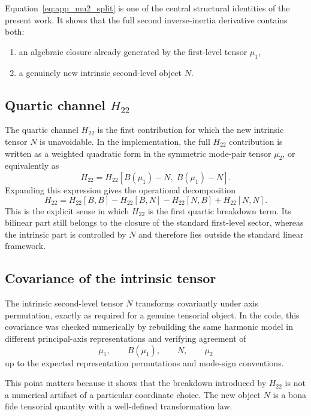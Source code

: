 Equation~\eqref{eq:app_mu2_split} is one of the central structural identities of
the present work. It shows that the full second inverse-inertia derivative
contains both:
\begin{enumerate}
\item an algebraic closure already generated by the first-level tensor $\mu_1$,
\item a genuinely new intrinsic second-level object $N$.
\end{enumerate}

\subsection{Quartic channel \texorpdfstring{$H_{22}$}{H22}}

The quartic channel $H_{22}$ is the first contribution for which the new
intrinsic tensor $N$ is unavoidable. In the implementation, the full $H_{22}$
contribution is written as a weighted quadratic form in the symmetric mode-pair
tensor $\mu_2$, or equivalently as
\begin{equation}
H_{22} = H_{22}[B(\mu_1)-N,\;B(\mu_1)-N].
\end{equation}
Expanding this expression gives the operational decomposition
\begin{equation}
H_{22}
=
H_{22}[B,B]
-H_{22}[B,N]
-H_{22}[N,B]
+H_{22}[N,N].
\end{equation}
This is the explicit sense in which $H_{22}$ is the first quartic breakdown
term. Its bilinear part still belongs to the closure of the standard
first-level sector, whereas the intrinsic part is controlled by $N$ and
therefore lies outside the standard linear framework.

\subsection{Covariance of the intrinsic tensor}

The intrinsic second-level tensor $N$ transforms covariantly under axis
permutation, exactly as required for a genuine tensorial object. In the code,
this covariance was checked numerically by rebuilding the same harmonic model in
different principal-axis representations and verifying agreement of
\begin{equation}
\mu_1,\qquad B(\mu_1),\qquad N,\qquad \mu_2
\end{equation}
up to the expected representation permutations and mode-sign conventions.

This point matters because it shows that the breakdown introduced by $H_{22}$
is not a numerical artifact of a particular coordinate choice. The new object
$N$ is a bona fide tensorial quantity with a well-defined transformation law.


